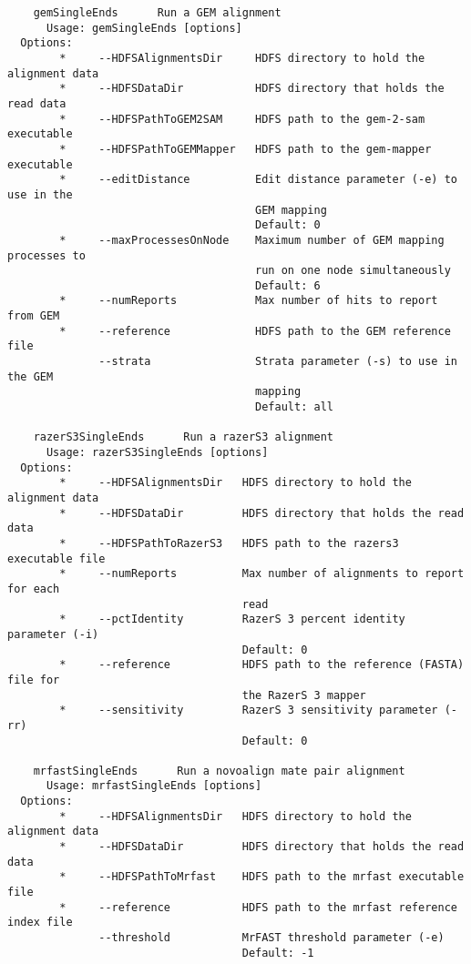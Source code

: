\documentclass[11pt]{article}
\begin{document}
\begin{verbatim}
    gemSingleEnds      Run a GEM alignment
      Usage: gemSingleEnds [options]
  Options:
        *     --HDFSAlignmentsDir     HDFS directory to hold the alignment data
        *     --HDFSDataDir           HDFS directory that holds the read data
        *     --HDFSPathToGEM2SAM     HDFS path to the gem-2-sam executable
        *     --HDFSPathToGEMMapper   HDFS path to the gem-mapper executable
        *     --editDistance          Edit distance parameter (-e) to use in the
                                      GEM mapping
                                      Default: 0
        *     --maxProcessesOnNode    Maximum number of GEM mapping processes to
                                      run on one node simultaneously
                                      Default: 6
        *     --numReports            Max number of hits to report from GEM
        *     --reference             HDFS path to the GEM reference file
              --strata                Strata parameter (-s) to use in the GEM
                                      mapping
                                      Default: all

    razerS3SingleEnds      Run a razerS3 alignment
      Usage: razerS3SingleEnds [options]
  Options:
        *     --HDFSAlignmentsDir   HDFS directory to hold the alignment data
        *     --HDFSDataDir         HDFS directory that holds the read data
        *     --HDFSPathToRazerS3   HDFS path to the razers3 executable file
        *     --numReports          Max number of alignments to report for each
                                    read
        *     --pctIdentity         RazerS 3 percent identity parameter (-i)
                                    Default: 0
        *     --reference           HDFS path to the reference (FASTA) file for
                                    the RazerS 3 mapper
        *     --sensitivity         RazerS 3 sensitivity parameter (-rr)
                                    Default: 0

    mrfastSingleEnds      Run a novoalign mate pair alignment
      Usage: mrfastSingleEnds [options]
  Options:
        *     --HDFSAlignmentsDir   HDFS directory to hold the alignment data
        *     --HDFSDataDir         HDFS directory that holds the read data
        *     --HDFSPathToMrfast    HDFS path to the mrfast executable file
        *     --reference           HDFS path to the mrfast reference index file
              --threshold           MrFAST threshold parameter (-e)
                                    Default: -1


\end{verbatim}
\end{document}
